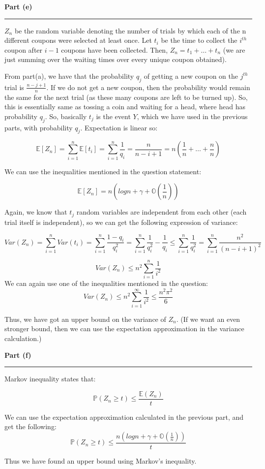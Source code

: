 \documentclass[a4paper,12pt]{article}
\newenvironment{solution}[2][]{%
    \begin{mdframed}[linecolor=blue!70!black, linewidth=2pt, roundcorner=10pt, backgroundcolor=yellow!10!white, skipabove=12pt, skipbelow=12pt]%
        \textbf{\large #2}
        \par\noindent\rule{\textwidth}{0.4pt}
}{
    \end{mdframed}
}
\begin{document}
\begin{solution}{Part (e)}
$Z_n$ be the random variable denoting the number of trials by which each of the n different coupons were selected at least once. Let $t_i$ be the time to collect the $i^{th}$ coupon after $i - 1$ coupons have been collected. Then, $Z_n = t_1 + \dots + t_n$ (we are just summing over the waiting times over every unique coupon obtained).

From part(a), we have that the probability $q_j$ of getting a new coupon on the $j^{th}$ trial is $\frac{n-j+1}{n}$. If we do not get a new coupon, then the probability would remain the same for the next trial (as these many coupons are left to be turned up). So, this is essentially same as tossing a coin and waiting for a head, where head has probability $q_j$. So, basically $t_j$ is the event $Y$, which we have used in the previous parts, with probability $q_j$. Expectation is linear so:

\[\mathbb{E}[Z_n] = \sum_{i=1}^{n}\mathbb{E}[t_i] = \sum_{i=1}^{n}\frac{1}{q_i} = \frac{n}{n-i+1} = n\left(\frac{1}{n} + \dots + \frac{n}{n}\right)\]

We can use the inequalities mentioned in the question statement:

\[\mathbb{E}[Z_n] = n\left(logn + \gamma + \mathbb{O}(\frac{1}{n})\right)\]


Again, we know that $t_j$ random variables are independent from each other (each trial itself is independent), so we can get the following expression of variance:

\[Var(Z_n) = \sum_{i=1}^{n}Var(t_i) = \sum_{i=1}^{n}\frac{1-q_i}{q_i^2} = \sum_{i=1}^{n}\frac{1}{q_i^2} - \frac{1}{q_i} \leq \sum_{i=1}^{n}\frac{1}{q_i^2} = \sum_{i=1}^{n}\frac{n^2}{(n - i + 1)^2}\]

\[Var(Z_n) \leq n^2\sum_{i=1}^{n}\frac{1}{i^2}\]
We can again use one of the inequalities mentioned in the question:
\[Var(Z_n) \leq n^2\sum_{i=1}^{\infty}\frac{1}{i^2} \leq \frac{n^2\pi^2}{6}\]

Thus, we have got an upper bound on the variance of $Z_n$. (If we want an even stronger bound, then we can use the expectation approximation in the variance calculation.)
\end{solution}

\begin{solution}{Part (f)}
  Markov inequality states that:

  \[\mathbb{P}(Z_n \geq t) \leq \frac{\mathbb{E}(Z_n)}{t}\]

  We can use the expectation approximation calculated in the previous part, and get the following:
  \[\mathbb{P}(Z_n \geq t) \leq \frac{n\left(logn + \gamma + \mathbb{O}(\frac{1}{n})\right)}{t}\]

  Thus we have found an upper bound using Markov's inequality.
\end{solution}
\end{document}
